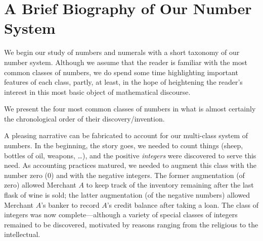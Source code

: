\section{A Brief Biography of Our Number System}
\label{sec:number-taxonomy}
\label{sec:numbers}

We begin our study of numbers and numerals with a short taxonomy of our number system.  Although we assume that the reader is familiar with the most common classes of numbers, we do spend some time highlighting important features of each class, partly, at least, in the hope of heightening the reader's interest in this most basic object of mathematical discourse.

We present the four most common classes of numbers in what is almost certainly the chronological order of their discovery/invention.

\medskip

\noindent {}

\medskip

  

\noindent
A pleasing narrative can be fabricated to account for our multi-class system of numbers.  In the beginning, the story goes, we needed to count things (sheep, bottles of oil, weapons, \ldots), and the positive {\it integers} were discovered to serve this need.  As accounting practices matured, we needed to augment this class with the number zero ($0$) and with the negative integers.  The former augmentation (of zero) allowed Merchant $A$ to keep track of the inventory remaining after the last flask of wine is sold; the latter augmentation (of the negative numbers) allowed Merchant $A$'s banker to record $A$'s credit balance after taking a loan.  The class of integers was now complete---although a variety of special classes of integers remained to be discovered, motivated by reasons ranging from the religious to the intellectual.

